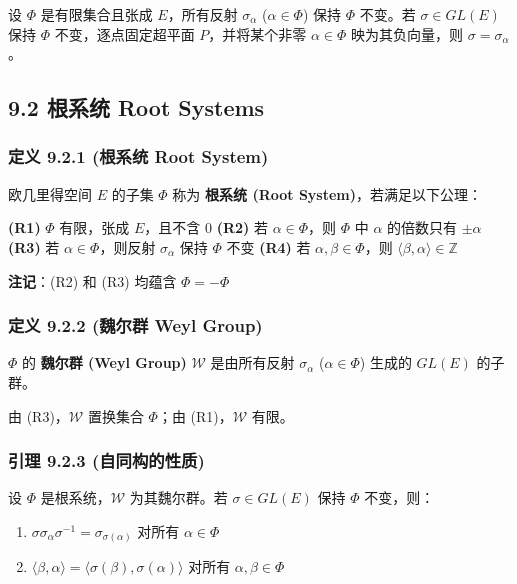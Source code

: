 设 $\Phi$ 是有限集合且张成 $E$，所有反射 $\sigma_\alpha$ ($\alpha \in \Phi$) 保持 $\Phi$ 不变。若 $\sigma \in GL(E)$ 保持 $\Phi$ 不变，逐点固定超平面 $P$，并将某个非零 $\alpha \in \Phi$ 映为其负向量，则 $\sigma = \sigma_\alpha$。

\subsection{9.2 根系统 Root Systems}

\subsubsection{定义 9.2.1 (根系统 Root System)}

欧几里得空间 $E$ 的子集 $\Phi$ 称为 \textbf{根系统 (Root System)}，若满足以下公理：

\textbf{(R1)} $\Phi$ 有限，张成 $E$，且不含 0
\textbf{(R2)} 若 $\alpha \in \Phi$，则 $\Phi$ 中 $\alpha$ 的倍数只有 $\pm\alpha$\textbf{(R3)} 若 $\alpha \in \Phi$，则反射 $\sigma_\alpha$ 保持 $\Phi$ 不变
\textbf{(R4)} 若 $\alpha, \beta \in \Phi$，则 $\langle\beta, \alpha\rangle \in \mathbb{Z}$

\textbf{注记}：(R2) 和 (R3) 均蕴含 $\Phi = -\Phi$

\subsubsection{定义 9.2.2 (魏尔群 Weyl Group)}

$\Phi$ 的 \textbf{魏尔群 (Weyl Group)} $\mathcal{W}$ 是由所有反射 $\sigma_\alpha$ ($\alpha \in \Phi$) 生成的 $GL(E)$ 的子群。

由 (R3)，$\mathcal{W}$ 置换集合 $\Phi$；由 (R1)，$\mathcal{W}$ 有限。

\subsubsection{引理 9.2.3 (自同构的性质)}

设 $\Phi$ 是根系统，$\mathcal{W}$ 为其魏尔群。若 $\sigma \in GL(E)$ 保持 $\Phi$ 不变，则：

\begin{enumerate}
	\item $\sigma \sigma_\alpha \sigma^{-1} = \sigma_{\sigma(\alpha)}$ 对所有 $\alpha \in \Phi$
	\item $\langle\beta, \alpha\rangle = \langle\sigma(\beta), \sigma(\alpha)\rangle$ 对所有 $\alpha, \beta \in \Phi$
\end{enumerate}


